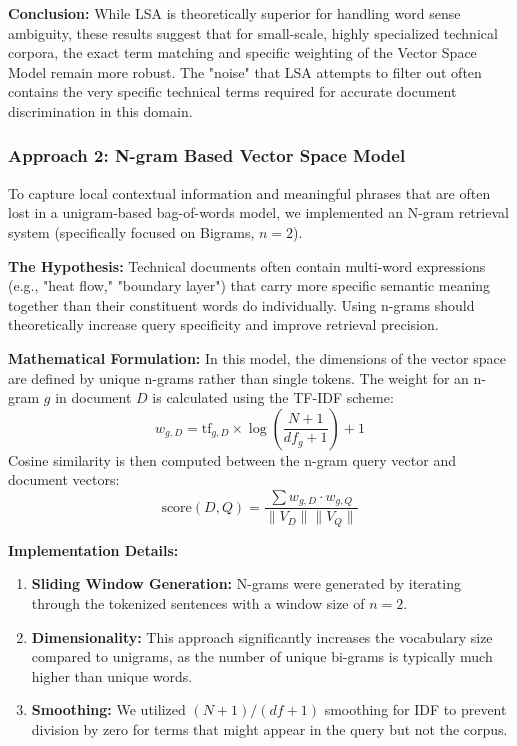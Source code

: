 \documentclass{article}
\begin{document}
\textbf{Conclusion:} While LSA is theoretically superior for handling word sense ambiguity, these results suggest that for small-scale, highly specialized technical corpora, the exact term matching and specific weighting of the Vector Space Model remain more robust. The "noise" that LSA attempts to filter out often contains the very specific technical terms required for accurate document discrimination in this domain.


\subsubsection{Approach 2: N-gram Based Vector Space Model}

To capture local contextual information and meaningful phrases that are often lost in a unigram-based bag-of-words model, we implemented an N-gram retrieval system (specifically focused on Bigrams, $n=2$).

\textbf{The Hypothesis:} Technical documents often contain multi-word expressions (e.g., "heat flow," "boundary layer") that carry more specific semantic meaning together than their constituent words do individually. Using n-grams should theoretically increase query specificity and improve retrieval precision.

\textbf{Mathematical Formulation:}
In this model, the dimensions of the vector space are defined by unique n-grams rather than single tokens. The weight for an n-gram $g$ in document $D$ is calculated using the TF-IDF scheme:
\[ w_{g,D} = \text{tf}_{g,D} \times \log\left(\frac{N+1}{df_g+1}\right) + 1 \]
Cosine similarity is then computed between the n-gram query vector and document vectors:
\[ \text{score}(D, Q) = \frac{\sum w_{g,D} \cdot w_{g,Q}}{\|V_D\| \|V_Q\|} \]

\textbf{Implementation Details:}
\begin{enumerate}
    \item \textbf{Sliding Window Generation:} N-grams were generated by iterating through the tokenized sentences with a window size of $n=2$.
    \item \textbf{Dimensionality:} This approach significantly increases the vocabulary size compared to unigrams, as the number of unique bi-grams is typically much higher than unique words.
    \item \textbf{Smoothing:} We utilized $(N+1)/(df+1)$ smoothing for IDF to prevent division by zero for terms that might appear in the query but not the corpus.
\end{enumerate}
\end{document}
